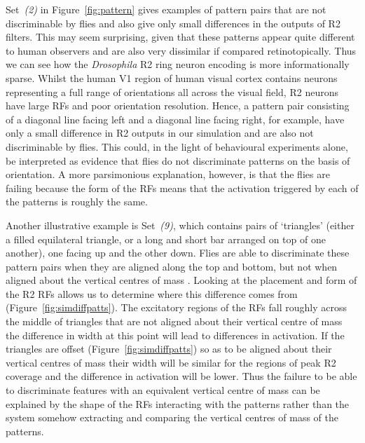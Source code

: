 Set~\emph{(2)} in Figure~\ref{fig:pattern} gives examples of pattern pairs that are not discriminable by flies and also give only small differences in the outputs of R2 filters. This may seem surprising, given that these patterns appear quite different to human observers and are also very dissimilar if compared retinotopically. Thus we can see how the \emph{Drosophila} R2 ring neuron encoding is more informationally sparse. Whilst the human V1 region of human visual cortex contains neurons representing a full range of orientations all across the visual field, R2 neurons have large RFs and poor orientation resolution. Hence, a pattern pair consisting of a diagonal line facing left and a diagonal line facing right, for example, have only a small difference in R2 outputs in our simulation and are also not discriminable by flies.
This could, in the light of behavioural experiments alone, be interpreted as evidence that flies do not discriminate patterns on the basis of orientation.
A more parsimonious explanation, however, is that the flies are failing because the form of the \acp{RF} means that the activation triggered by each of the patterns is roughly the same.

Another illustrative example is Set~\emph{(9)}, which contains pairs of `triangles' (either a filled equilateral triangle, or a long and short bar arranged on top of one another), one facing up and the other down.
Flies are able to discriminate these pattern pairs when they are aligned along the top and bottom, but not when aligned about the vertical centres of mass \cite{Ernst1999}. Looking at the placement and form of the R2 RFs allows us to determine where this difference comes from (Figure~\ref{fig:simdiffpatts}).
The excitatory regions of the RFs fall roughly across the middle of triangles that are not aligned about their vertical centre of mass the difference in width at this point will lead to differences in activation. If the triangles are offset (Figure~\ref{fig:simdiffpatts}) so as to be aligned about their vertical centres of mass their width will be similar for the regions of peak R2 coverage and the difference in activation will be lower.
Thus the failure to be able to discriminate features with an equivalent vertical centre of mass can be explained by the shape of the RFs interacting with the patterns rather than the system somehow extracting and comparing the vertical centres of mass of the patterns.

%

